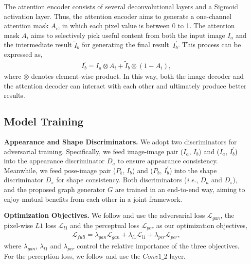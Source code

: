 \documentclass{bmvc2k}
\begin{document}
The attention encoder consists of several deconvolutional layers and a Sigmoid activation layer. Thus, the attention encoder aims to generate a one-channel attention mask $A_i$, in which each pixel value is between 0 to 1.
The attention mask $A_i$ aims to selectively pick useful content from both the input image $I_a$ and the intermediate result $\tilde{I}_b$ for generating the final result~$I_b^{'}$. This process can be expressed as,
\begin{equation}
\begin{aligned}
I_b^{'} = I_a \otimes  A_i + \tilde{I}_b \otimes (1 - A_i),
\end{aligned}
\label{eq:att}
\end{equation}
where $\otimes$ denotes element-wise product.
In this way, both the image decoder and the attention decoder can interact with each other and ultimately produce better results.

\subsection{Model Training}
\noindent \textbf{Appearance and Shape Discriminators.} 
We adopt two discriminators for adversarial training.
Specifically, we feed image-image pair ($I_a$, $I_b$) and ($I_a$, $I_b^{'}$) into the appearance discriminator $D_a$ to ensure appearance consistency.
Meanwhile, we feed pose-image pair ($P_b$, $I_b$) and ($P_b$, $I_b^{'}$) into the shape discriminator $D_s$ for shape consistency.
Both discriminators (\emph{i.e.}, $D_a$ and $D_s$), and the proposed graph generator $G$ are trained in an end-to-end way, aiming to enjoy mutual benefits from each other in a joint framework.

\noindent \textbf{Optimization Objectives.} We follow \cite{zhu2019progressive,tang2020xinggan} and use the adversarial loss $\mathcal{L}_{gan}$, the pixel-wise $L1$ loss $\mathcal{L}_{l1}$ and the perceptual loss $\mathcal{L}_{per}$ as our optimization objectives,
\begin{equation}
\begin{aligned}
\mathcal{L}_{full} = \lambda_{gan} \mathcal{L}_{gan} + \lambda_{l1} \mathcal{L}_{l1} + \lambda_{per} \mathcal{L}_{per},
\end{aligned}
\label{eq:loss}
\end{equation}
where $\lambda_{gan}$, $\lambda_{l1}$ and $\lambda_{per}$ control the relative importance of the three objectives.
For the perception loss, we follow \cite{zhu2019progressive,tang2020xinggan} and use the $Conv1\_2$ layer.
\end{document}
